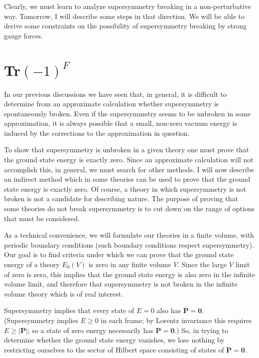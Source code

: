 \documentclass[11pt,a4paper]{article}
\begin{document}
Clearly, we must learn to analyze supersymmetry breaking in a
non-perturbative way. Tomorrow, I will describe some steps in that
direction. We will be able to derive some constraints on the possibility
of supersymmetry breaking by strong gauge forces.

\section[Tr(-1)^F]{Tr$(-1)^F$}

In our previous discussions we have seen that, in general, it
is difficult to determine from an approximate calculation whether
supersymmetry is spontaneously broken. Even if the supersymmetry
seems to be unbroken in some approximation, it is always possible
that a small, non-zero vacuum energy is induced by the corrections
to the approximation in question.

To show that supersymmetry is unbroken in a given theory one
must prove that the ground state energy is exactly zero. Since an
approximate calculation will not accomplish this, in general, we
must search for other methods. I will now describe an indirect
method which in some theories can be used to prove that the ground
state energy is exactly zero. Of course, a theory in which supersymmetry
is not broken is not a candidate for describing nature. The
purpose of proving that some theories do not break supersymmetry is
to cut down on the range of options that must be considered.

As a technical convenience, we will formulate our theories in a
finite volume, with periodic boundary conditions (such boundary conditions
respect supersymmetry). Our goal is to find criteria under
which we can prove that the ground state energy of a theory $E_0(V)$ is
zero in any finite volume $V$. Since the large $V$ limit of zero is zero,
this implies that the ground state energy is also zero in the infinite
volume limit, and therefore that supersymmetry is not broken in the
infinite volume theory which is of real interest.

Supersymmetry implies that every state of $E = 0$ also has $\mathbf P = \mathbf 0$.
(Supersymmetry implies $E \geq 0$ in each frame; by Lorentz invariance
this requires $E \geq |\mathbf P|$; so a state of zero energy necessarily has
$\mathbf P = \mathbf 0$.) So, in trying to determine whether the ground state energy
vanishes, we lose nothing by restricting ourselves to the sector of
Hilbert space consisting of states of $\mathbf P = \mathbf 0$.
\end{document}
